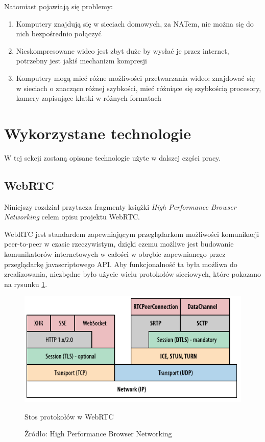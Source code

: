 Natomiast pojawiają się problemy:

\begin{enumerate}
    \item Komputery znajdują się w sieciach domowych, za NATem, nie można się do nich bezpośrednio
          połączyć
    \item Nieskompresowane wideo jest zbyt duże by wysłać je przez internet, potrzebny jest jakiś
          mechanizm kompresji
    \item Komputery mogą mieć różne możliwości przetwarzania wideo: znajdować się w sieciach o
          znacząco różnej szybkości, mieć różniące się szybkością procesory, kamery zapisujące
          klatki w różnych formatach
\end{enumerate}

\section{Wykorzystane technologie}

W tej sekcji zostaną opisane technologie użyte w dalszej części pracy.

\subsection{WebRTC}

Niniejszy rozdział przytacza fragmenty książki \emph{High Performance Browser Networking}
\cite{hpbn} celem opisu projektu WebRTC.

WebRTC jest standardem zapewniającym przeglądarkom możliwości komunikacji peer-to-peer w czasie
rzeczywistym, dzięki czemu możliwe jest budowanie komunikatorów internetowych w całości w obrębie
zapewnianego przez przeglądarkę javascriptowego API. Aby funkcjonalność ta była możliwa do
zrealizowania, niezbędne było użycie wielu protokołów sieciowych, które pokazano na rysunku
\ref{fig:webrtc_stack}.

\begin{figure}[htbp]
    \centering
    \includegraphics{img/webrtc-stack_hpbn}
    \caption{Stos protokołów w WebRTC}
    \caption*{Źródło: High Performance Browser Networking\cite{hpbn}}
    \label{fig:webrtc_stack}
\end{figure}

